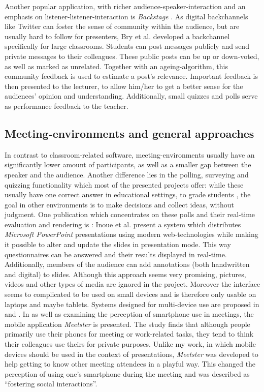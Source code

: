 Another popular application, with richer audience-spea\-ker-in\-ter\-ac\-tion and an emphasis on listener-listener-interaction is \emph{Backstage} \cite{Bry:Backstage}. As digital backchannels like Twitter can foster the sense of community within the audience, but are usually hard to follow for presenters, Bry et al. developed a backchannel specifically for large classrooms. Students can post messages publicly and send private messages to their colleagues. These public posts can be up or down-voted, as well as marked as unrelated. Together with an ageing-algorithm, this community feedback is used to estimate a post's relevance. Important feedback is then presented to the lecturer, to allow him/her to get a better sense for the audiences' opinion and understanding. Additionally, small quizzes and polls serve as performance feedback to the teacher.

\subsection{Meeting-environments and general approaches}

In contrast to classroom-related software, meeting-en\-vi\-ron\-ments usually have an significantly lower amount of participants, as well as a smaller gap between the speaker and the audience. Another difference lies in the polling, surveying and quizzing functionality which most of the presented projects offer: while these usually have one correct answer in educational settings, to grade students \cite{Lindquist:ExploringMobilePhonesActiveLearning, Triglianos:InteractiveWebPresentationsImpress, Bry:Backstage}, the goal in other environments is to make decisions and collect ideas, without judgment.
One publication which concentrates on these polls and their real-time evaluation and rendering is \cite{Inoue:RealTimeQuestionnaire}: Inoue et al. present a system which distributes \emph{Microsoft PowerPoint} presentations using modern web-technologies while making it possible to alter and update the slides in presentation mode. This way questionnaires can be answered and their results displayed in real-time. Additionally, members of the audience can add annotations (both handwritten and digital) to slides. Although this approach seems very promising, pictures, videos and other types of media are ignored in the project. Moreover the interface seems to complicated to be used on small devices and is therefore only usable on laptops and maybe tablets. Systems designed for multi-device use are proposed in \cite{Bohmer:SmartphoneUseRude} and \cite{Teevan:MobileFeedbackDuringPresentation}. In \cite{Bohmer:SmartphoneUseRude} as well as examining the perception of smartphone use in meetings, the mobile application \emph{Meetster} is presented. The study finds that although people primarily use their phones for meeting or work-related tasks, they tend to think their colleagues use theirs for private purposes. Unlike my work, in which mobile devices should be used in the context of presentations, \emph{Meetster} was developed to help getting to know other meeting attendees in a playful way. This changed the perception of using one's smartphone during the meeting and was described as ``fostering social interactions''.

